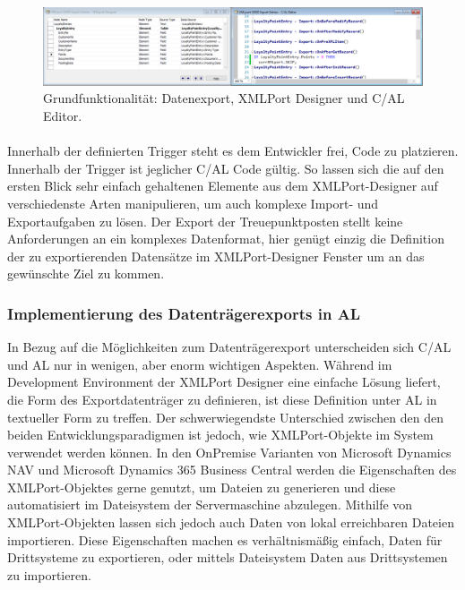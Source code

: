 \begin{figure}[h]
	\centering
	\includegraphics[width=145mm]{images/xmlport}
	\caption{Grundfunktionalität: Datenexport, XMLPort Designer und C/AL Editor.}
	\label{fig:Request Page}
\end{figure}

\paragraph{}
Innerhalb der definierten Trigger steht es dem Entwickler frei, Code zu platzieren. Innerhalb der Trigger ist jeglicher C/AL Code gültig. So lassen sich die auf den ersten Blick sehr einfach gehaltenen Elemente aus dem XMLPort-Designer auf verschiedenste Arten manipulieren, um auch komplexe Import- und Exportaufgaben zu lösen. Der Export der Treuepunktposten stellt keine Anforderungen an ein komplexes Datenformat, hier genügt einzig die Definition der zu exportierenden Datensätze im XMLPort-Designer Fenster um an das gewünschte Ziel zu kommen.
\pagebreak


\subsubsection{Implementierung des Datenträgerexports in AL}
In Bezug auf die Möglichkeiten zum Datenträgerexport unterscheiden sich C/AL und AL nur in wenigen, aber enorm wichtigen Aspekten. Während im Development Environment der XMLPort Designer eine einfache Lösung liefert, die Form des Exportdatenträger zu definieren, ist diese Definition unter AL in textueller Form zu treffen. Der schwerwiegendste Unterschied zwischen den den beiden Entwicklungsparadigmen ist jedoch, wie XMLPort-Objekte im System verwendet werden können. In den OnPremise Varianten von Microsoft Dynamics NAV und Microsoft Dynamics 365 Business Central werden die Eigenschaften des XMLPort-Objektes gerne genutzt, um Dateien zu generieren und diese automatisiert im Dateisystem der Servermaschine abzulegen. Mithilfe von XMLPort-Objekten lassen sich jedoch auch Daten von lokal erreichbaren Dateien importieren. Diese Eigenschaften machen es verhältnismäßig einfach, Daten für Drittsysteme zu exportieren, oder mittels Dateisystem Daten aus Drittsystemen zu importieren. 

